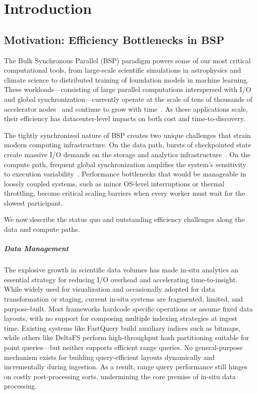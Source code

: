 
\chapter{Introduction}

\section{Motivation: Efficiency Bottlenecks in BSP}

The Bulk Synchronous Parallel (BSP) paradigm powers some of our most critical computational tools,
from large-scale scientific simulations in astrophysics and climate science to distributed training
of foundation models in machine learning.
These workloads---consisting of large parallel computations interspersed with I/O and global
synchronization---currently operate at the scale of tens of thousands of accelerator
nodes~\cite{Das2023:LargeScale,Stock2024:LargeScale,Gratt2024:Llama3Scale,:LlamaScale} and continue
to grow with time~\cite{Rahma2024:MLScale}.
As these applications scale, their efficiency has datacenter-level impacts on both cost and
time-to-discovery.

The tightly synchronized nature of BSP creates two unique challenges that strain modern computing
infrastructure.
On the data path, bursts of checkpointed state create massive I/O demands on the storage and
analytics infrastructure~\cite{Eisen2022:Checkpoint}.
On the compute path, frequent global synchronization amplifies the system's sensitivity to
execution variability~\cite{Hoefl2010:Noise,Petri2003:Missing,Yildi2016:IONoise}.
Performance bottlenecks that would be manageable in loosely coupled systems, such as minor OS-level
interruptions or thermal throttling, become critical scaling barriers when every worker must wait
for the slowest participant.

We now describe the status quo and outstanding efficiency challenges along the data and compute
paths.

\paragraph{Data Management}
The explosive growth in scientific data volumes has made in-situ analytics an essential strategy
for reducing I/O overhead and accelerating time-to-insight.
While widely used for visualization and occasionally adopted for data transformation or staging,
current in-situ systems are fragmented, limited, and purpose-built.
Most frameworks hardcode specific operations or assume fixed data layouts, with no support for
composing multiple indexing strategies at ingest time.
Existing systems like FastQuery build auxiliary indices such as bitmaps, while others like DeltaFS
perform high-throughput hash partitioning suitable for point queries—but neither supports efficient
range queries.
No general-purpose mechanism exists for building query-efficient layouts dynamically and
incrementally during ingestion.
As a result, range query performance still hinges on costly post-processing sorts, undermining the
core premise of in-situ data processing.


